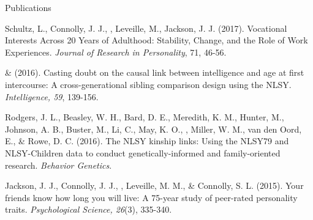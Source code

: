 \begin{rSection}{\textrm{Publications}}
\begin{etaremune}
%
\item Schultz, L., Connolly, J. J., \meb, Leveille, M., Jackson, J. J. (2017). Vocational Interests Across 20 Years of Adulthood: Stability, Change, and the Role of Work Experiences. \textit{Journal of Research in Personality}, 71, 46-56.
\item \meb \& \Joe (2016). Casting doubt on the causal link between intelligence and age at first intercourse: A cross-generational sibling comparison design using the NLSY. \textit{Intelligence, 59}, 139-156. 
%
\item Rodgers, J. L., Beasley, W. H., Bard, D. E., Meredith, K. M., Hunter, M., Johnson, A. B., Buster, M., Li, C., May, K. O., \meb, Miller, W. M., van den Oord, E., \& Rowe, D. C. (2016). The NLSY kinship links: Using the NLSY79 and NLSY-Children data to conduct genetically-informed and family-oriented research. \textit{Behavior Genetics}. 
%
\item Jackson, J. J., Connolly, J. J., \meb, Leveille, M. M., \& Connolly, S. L. (2015). Your friends know how long you will live: A 75-year study of peer-rated personality traits. \textit{Psychological Science, 26}(3), 335-340. 
%
\end{etaremune}\end{rSection}%
